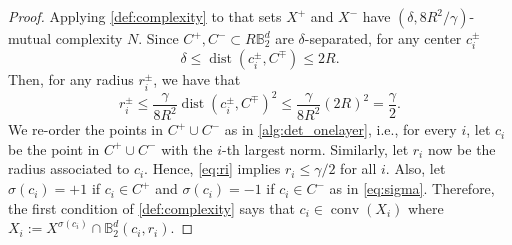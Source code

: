 \documentclass[aoap]{imsart}
\numberwithin{equation}{section}
\theoremstyle{definition}
\theoremstyle{remark}
\numberwithin{equation}{section}
\newcommand{\0}{\mathbf{0}}
\newcommand{\1}{\mathbf{1}}
\newcommand{\B}{\mathbb{B}}
\DeclareMathOperator{\dist}{dist}
\DeclareMathOperator{\conv}{conv}
\numberwithin{equation}{section}
\begin{document}
\begin{proof}
	Applying \cref{def:complexity} to that sets $X^+$ and $X^-$ have $(\delta, 8R^2/\gamma)$-mutual complexity $N$. Since $C^+, C^-\subset R\B_2^d$ are $\delta$-separated, for any center $c_i^\pm$
\[ \delta\leq \dist \left(c_{i}^\pm, C^{\mp}\right)\leq 2R.\] 
Then, for any radius $r_i^\pm$, we have that
\begin{equation}\label{eq:ri}
r_i^\pm \leq \frac{\gamma}{8R^2}\dist \left(c_{i}^\pm, C^{\mp}\right)^2 \leq \frac{\gamma}{8R^2} (2R)^2=\frac{\gamma}{2}.
\end{equation}
We re-order the points in $C^+\cup C^-$ as in \cref{alg:det_onelayer}, i.e., for every $i$, let $c_i$ be the point in $C^+\cup C^-$ with the $i$-th largest norm. Similarly, let $r_i$ now be the radius associated to $c_i$. Hence, \eqref{eq:ri} implies $r_i\leq \gamma/2$ for all $i$. Also, let $\sigma (c_i)=+1$ if $c_i\in C^+$ and $\sigma (c_i)=-1$ if $c_i\in C^-$ as in \eqref{eq:sigma}. Therefore, the first condition of \cref{def:complexity} says that $c_i\in \conv(X_i)$ where $X_i:=X^{\sigma(c_i)}\cap \B_2^d(c_i, r_i)$.


\end{proof}
\end{document}
